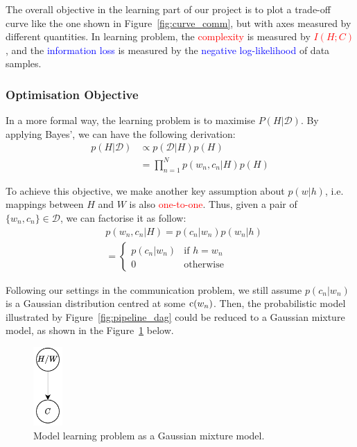 \documentclass[11pt]{article}
\begin{document}
The overall objective in the learning part of our project is to plot a trade-off curve like the one shown in Figure~\ref{fig:curve_comm}, but with axes measured by different quantities.
In learning problem, the \textcolor{red}{complexity} is measured by \textcolor{red}{$I(H;C)$}, and the \textcolor{blue}{information loss} is measured by the \textcolor{blue}{negative log-likelihood} of data samples. 


\subsubsection{Optimisation Objective}
\label{ssec:learn_optim}

In a more formal way, the learning problem is to maximise $P(H|\mathcal{D})$. 
By applying Bayes', we can have the following derivation:
\begin{equation}
    \begin{split}
        p(H|\mathcal{D})
        & \propto p(\mathcal{D}|H)p(H) \\
        & = \prod_{n=1}^{N} p(w_n, c_n|H)p(H)
    \end{split}
    \label{eq:learning_objective_pH_D}
\end{equation}

To achieve this objective, we make another key assumption about $p(w|h)$, i.e. mappings between $H$ and $W$ is also \textcolor{red}{one-to-one}.
Thus, given a pair of $\{w_n, c_n\}\in\mathcal{D}$, we can factorise it as follow:
\begin{equation}
    \begin{aligned}
     & p(w_n, c_n|H) = p(c_n|w_n)p(w_n|h) \\
     & =
        \begin{cases}
            p(c_n|w_n) & \text{if $h=w_n$}\\
            0 & \text{otherwise}
        \end{cases} 
    \end{aligned}
    \label{eq:factorise_data_pair}
\end{equation}

Following our settings in the communication problem, we still assume $p(c_n|w_n)$ is a Gaussian distribution centred at some ${\textnormal{c}}(w_n)$.
Then, the probabilistic model illustrated by Figure~\ref{fig:pipeline_dag} could be reduced to a Gaussian mixture model, as shown in the Figure~\ref{fig:learn_gaussian_mix} below.
\begin{figure}[h]
    \centering
    \includegraphics[width=0.1\textwidth]{docs/intro_rate_distortion/graphs/mixture_gaussian.pdf}
    \caption{Model learning problem as a Gaussian mixture model.}
    \label{fig:learn_gaussian_mix}
\end{figure}
\end{document}
